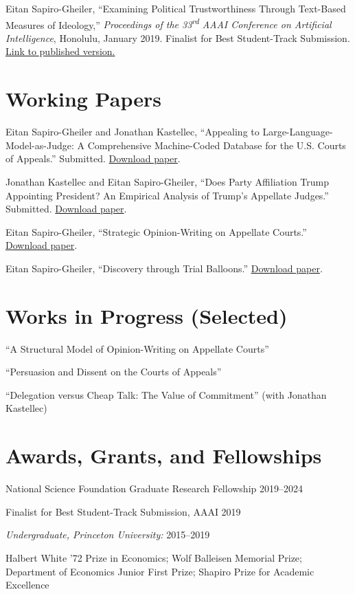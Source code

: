 \documentclass[11pt,reqno]{amsart}
\begin{document}
Eitan Sapiro-Gheiler, ``Examining Political Trustworthiness Through Text-Based Measures of Ideology,'' \textit{Proceedings of the 33\textsuperscript{rd} AAAI Conference on Artificial Intelligence}, Honolulu, January 2019. Finalist for Best Student-Track Submission. \href{https://ojs.aaai.org/index.php/AAAI/article/view/5151}{Link to published version.}

\section*{Working Papers}
Eitan Sapiro-Gheiler and Jonathan Kastellec, ``Appealing to Large-Language-Model-as-Judge: A Comprehensive Machine-Coded Database for the U.S. Courts of Appeals.'' Submitted. \href{https://eitansg.github.io/files/llm_appeals.pdf}{Download paper}.

Jonathan Kastellec and Eitan Sapiro-Gheiler, ``Does Party Affiliation Trump Appointing President? An Empirical Analysis of Trump's Appellate Judges.'' Submitted. \href{https://eitansg.github.io/files/trump.pdf}{Download paper}.

Eitan Sapiro-Gheiler, ``Strategic Opinion-Writing on Appellate Courts.'' \href{https://tinyurl.com/eitan-jmp}{Download paper}.

Eitan Sapiro-Gheiler, ``Discovery through Trial Balloons.'' \href{https://tinyurl.com/esg-pers}{Download paper}.

\section*{Works in Progress (Selected)}
``A Structural Model of Opinion-Writing on Appellate Courts''

``Persuasion and Dissent on the Courts of Appeals''

``Delegation versus Cheap Talk: The Value of Commitment'' (with Jonathan Kastellec)

\section*{Awards, Grants, and Fellowships}
National Science Foundation Graduate Research Fellowship \hfill 2019--2024

Finalist for Best Student-Track Submission, AAAI \hfill 2019

\textit{Undergraduate, Princeton University:} \hfill 2015--2019\\
\parbox[t]{0.7\textwidth}{Halbert White '72 Prize in Economics; Wolf Balleisen Memorial Prize; Department of Economics Junior First Prize; Shapiro Prize for Academic Excellence}
\end{document}
